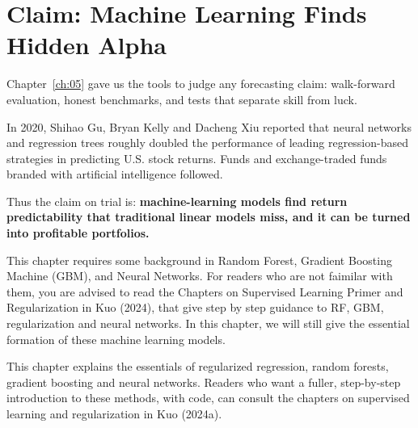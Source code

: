 \makeatletter
{}
\makeatother

\chapter{Claim: Machine Learning Finds Hidden Alpha}
\label{ch:21}


Chapter~\ref{ch:05} gave us the tools to judge any forecasting claim: walk-forward evaluation, honest benchmarks, and tests that separate skill from luck. 

In 2020, Shihao Gu, Bryan Kelly and Dacheng Xiu reported that neural networks and regression trees roughly doubled the performance of leading regression-based strategies in predicting U.S. stock returns. Funds and exchange-traded funds branded with artificial intelligence followed.

Thus the claim on trial is: \textbf{machine-learning models find return predictability that traditional linear models miss, and it can be turned into profitable portfolios.}

This chapter requires some background in Random Forest, Gradient Boosting Machine (GBM), and Neural Networks. For readers who are not faimilar with them, you are advised to read the Chapters on Supervised Learning Primer and Regularization in Kuo (2024), that give step by step guidance to RF, GBM, regularization and neural networks. In this chapter, we will still give the essential formation of these machine learning models.

This chapter explains the essentials of regularized regression, random forests, gradient boosting and neural networks. Readers who want a fuller, step-by-step introduction to these methods, with code, can consult the chapters on supervised learning and regularization in Kuo (2024a).


